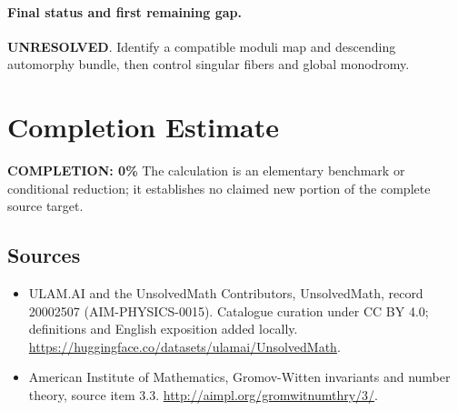 \documentclass[11pt]{article}
\begin{document}
\paragraph{Final status and first remaining gap.}
\textbf{UNRESOLVED}. Identify a compatible moduli map and descending automorphy bundle, then control singular fibers and global monodromy.

\section{Completion Estimate}
\noindent\textbf{COMPLETION: 0\%}
The calculation is an elementary benchmark or conditional reduction; it establishes no claimed new portion of the complete source target.

\subsection{Sources}
\begin{itemize}
\item[\hypertarget{source:20002507:1}{S1}] ULAM.AI and the UnsolvedMath Contributors, UnsolvedMath, record 20002507 (AIM-PHYSICS-0015). Catalogue curation under CC BY 4.0; definitions and English exposition added locally.
\url{https://huggingface.co/datasets/ulamai/UnsolvedMath}.
\item[\hypertarget{source:20002507:2}{S2}] American Institute of Mathematics, Gromov-Witten invariants and number theory, source item 3.3.
\url{http://aimpl.org/gromwitnumthry/3/}.
\end{itemize}
\label{end:20002507}
\end{document}

